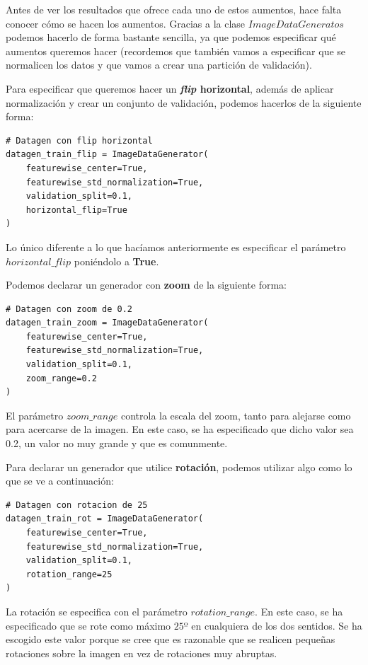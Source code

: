 \documentclass[11pt,a4paper]{article}
\begin{document}
Antes de ver los resultados que ofrece cada uno de estos aumentos, hace falta conocer cómo se hacen los aumentos.
Gracias a la clase $ImageDataGeneratos$ podemos hacerlo de forma bastante sencilla, ya que podemos especificar qué
aumentos queremos hacer (recordemos que también vamos a especificar que se normalicen los datos y que vamos a crear
una partición de validación).

Para especificar que queremos hacer un \textbf{\textit{flip} horizontal}, además de aplicar normalización y crear
un conjunto de validación, podemos hacerlos de la siguiente forma:

\begin{lstlisting}
# Datagen con flip horizontal
datagen_train_flip = ImageDataGenerator(
    featurewise_center=True,
    featurewise_std_normalization=True,
    validation_split=0.1,
    horizontal_flip=True
)
\end{lstlisting}

Lo único diferente a lo que hacíamos anteriormente es especificar el parámetro $horizontal\_flip$ poniéndolo a \textbf{True}.

Podemos declarar un generador con \textbf{zoom} de la siguiente forma:

\begin{lstlisting}
# Datagen con zoom de 0.2
datagen_train_zoom = ImageDataGenerator(
    featurewise_center=True,
    featurewise_std_normalization=True,
    validation_split=0.1,
    zoom_range=0.2
)
\end{lstlisting}

El parámetro $zoom\_range$ controla la escala del zoom, tanto para alejarse como para acercarse de la imagen. En este caso,
se ha especificado que dicho valor sea 0.2, un valor no muy grande y que es comunmente.

Para declarar un generador que utilice \textbf{rotación}, podemos utilizar algo como lo que se ve a continuación:

\begin{lstlisting}
# Datagen con rotacion de 25
datagen_train_rot = ImageDataGenerator(
    featurewise_center=True,
    featurewise_std_normalization=True,
    validation_split=0.1,
    rotation_range=25
)
\end{lstlisting}

La rotación se especifica con el parámetro $rotation\_range$. En este caso, se ha especificado que se rote como máximo
$25º$ en cualquiera de los dos sentidos. Se ha escogido este valor porque se cree que es razonable que se realicen pequeñas
rotaciones sobre la imagen en vez de rotaciones muy abruptas.
\end{document}
